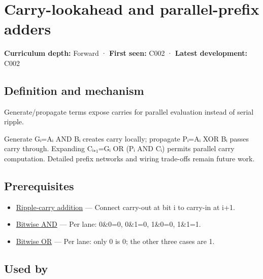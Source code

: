 \hypertarget{appendix-b5c46b2d94ff}{}\label{referencestart:appendix-b5c46b2d94ff}
\section{Carry-lookahead and parallel-prefix adders}\label{appendix-b5c46b2d94ff-carry-lookahead-and-parallel-prefix-adders}

\textbf{Curriculum depth:} Forward · \textbf{First seen:} C002 · \textbf{Latest development:} C002

\begin{allmightroledefinition}

\subsection{Definition and mechanism}\label{appendix-b5c46b2d94ff-definition-and-mechanism}

Generate/propagate terms expose carries for parallel evaluation instead of serial ripple.

\end{allmightroledefinition}

Generate Gᵢ=Aᵢ AND Bᵢ creates carry locally; propagate Pᵢ=Aᵢ XOR Bᵢ passes carry through. Expanding Cᵢ₊₁=Gᵢ OR (Pᵢ AND Cᵢ) permits parallel carry computation. Detailed prefix networks and wiring trade-offs remain future work.

\subsection{Prerequisites}\label{appendix-b5c46b2d94ff-prerequisites}

\begin{itemize}
\tightlist
\item
  \hyperref[appendix-17917d9fdbe3]{Ripple-carry addition} --- Connect carry-out at bit i to carry-in at i+1.
\item
  \hyperref[appendix-68b52453737c]{Bitwise AND} --- Per lane: 0\&0=0, 0\&1=0, 1\&0=0, 1\&1=1.
\item
  \hyperref[appendix-a427ce8ce8a6]{Bitwise OR} --- Per lane: only 0 is 0; the other three cases are 1.
\end{itemize}

\subsection{Used by}\label{appendix-b5c46b2d94ff-used-by}

